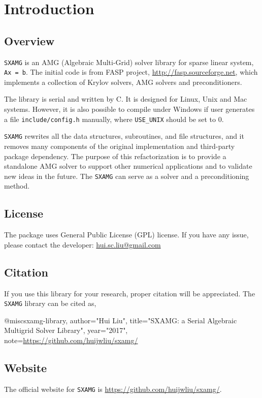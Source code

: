 
\chapter{Introduction}

\section{Overview}

\verb|SXAMG| is an AMG (Algebraic Multi-Grid) solver 
library for sparse linear system, \verb|Ax = b|. 
The initial code is from FASP project, \url{http://fasp.sourceforge.net}, which implements a collection of Krylov solvers, AMG solvers and preconditioners.

The library is serial and written by C.
It is designed for Linux, Unix and Mac systems. However, 
it is also possible to compile under Windows if user generates a file \verb|include/config.h| manually,
where \verb|USE_UNIX| should be set to 0. 

\verb|SXAMG| rewrites all the data structures, subroutines, and file structures, and it removes many components of the original implementation and third-party package dependency.
The purpose of this refactorization is to provide a standalone AMG solver to support 
other numerical applications and to validate new ideas in the future. 
The \verb|SXAMG| can serve as a solver and a preconditioning method.

\section{License}

The package uses General Public License (GPL) license. 
If you have any issue, please contact the developer: \href{mailto: hui.sc.liu@gmail.com}{hui.sc.liu@gmail.com}

\section{Citation}

If you use this library for your research, proper citation will be appreciated.
The \verb|SXAMG| library can be cited as,
\begin{evb}
@misc{sxamg-library,
    author="Hui Liu",
    title="SXAMG: a Serial Algebraic Multigrid Solver Library",
    year="2017",
    note={\url{https://github.com/huijwliu/sxamg/}}
}
\end{evb}


\section{Website}
The official website for \verb|SXAMG| is \url{https://github.com/huijwliu/sxamg/}.

